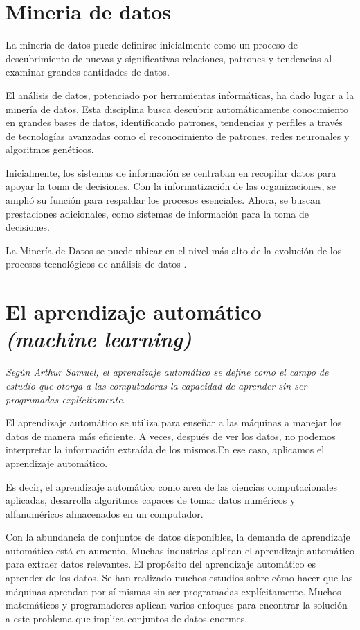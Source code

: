 \section{Mineria de datos}
La minería de datos puede definirse inicialmente como un proceso de descubrimiento de nuevas y significativas relaciones, patrones y tendencias al examinar grandes cantidades de datos\cite{perez2007mineria}.

El análisis de datos, potenciado por herramientas informáticas, ha dado lugar a la minería de datos. Esta disciplina busca descubrir automáticamente conocimiento en grandes bases de datos, identificando patrones, tendencias y perfiles a través de tecnologías avanzadas como el reconocimiento de patrones, redes neuronales y algoritmos genéticos.

Inicialmente, los sistemas de información se centraban en recopilar datos para apoyar la toma de decisiones. Con la informatización de las organizaciones, se amplió su función para respaldar los procesos esenciales. Ahora, se buscan prestaciones adicionales, como sistemas de información para la toma de decisiones.

La Minería de Datos se puede ubicar en el nivel más alto de la evolución de los procesos tecnológicos de análisis de datos \cite{martinez2001mineria}.

\section{El aprendizaje automático \textit{(machine learning)}}

\textit{Según Arthur Samuel, el aprendizaje automático se define como el campo de estudio que otorga a las computadoras la capacidad de aprender sin ser programadas explícitamente}\cite{mahesh2020machine}. 

El aprendizaje automático se utiliza para enseñar a las máquinas a manejar los datos de manera más eficiente. A veces, después de ver los datos, no podemos interpretar la información extraída de los mismos.En ese caso, aplicamos el aprendizaje automático.

Es decir, el aprendizaje automático como area de las ciencias computacionales aplicadas, desarrolla algoritmos capaces de tomar datos numéricos y alfanuméricos almacenados en un computador\cite{herrera2020prediccion}. 

Con la abundancia de conjuntos de datos disponibles, la demanda de aprendizaje automático está en aumento. Muchas industrias aplican el aprendizaje automático para extraer datos relevantes. El propósito del aprendizaje automático es aprender de los datos. Se han realizado muchos estudios sobre cómo hacer que las máquinas aprendan por sí mismas sin ser programadas explícitamente. Muchos matemáticos y programadores aplican varios enfoques para encontrar la solución a este problema que implica conjuntos de datos enormes\cite{mahesh2020machine}.

